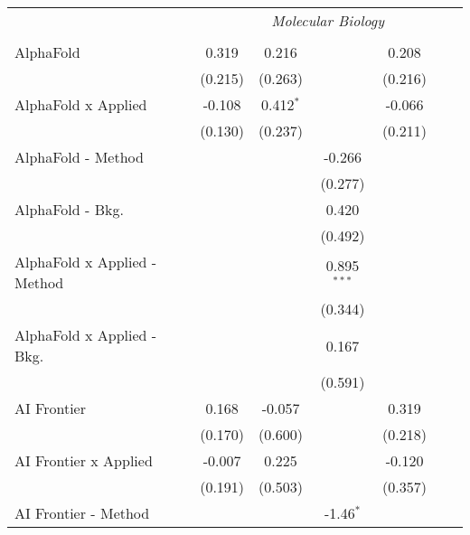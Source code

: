 \begin{tabular}{lcccccc}
 & \multicolumn{6}{c}{\textit{Molecular Biology}} \\ \\
   AlphaFold                      & 0.319    & 0.216         &               & 0.208   &        &   \\   
                                  & (0.215)  & (0.263)       &               & (0.216) &        &   \\   
   AlphaFold x Applied            & -0.108   & 0.412$^{*}$   &               & -0.066  &        &   \\   
                                  & (0.130)  & (0.237)       &               & (0.211) &        &   \\   
   AlphaFold - Method             &          &               & -0.266        &         &        &   \\   
                                  &          &               & (0.277)       &         &        &   \\   
   AlphaFold - Bkg.               &          &               & 0.420         &         &        &   \\   
                                  &          &               & (0.492)       &         &        &   \\   
   AlphaFold x Applied - Method   &          &               & 0.895$^{***}$ &         &        &   \\   
                                  &          &               & (0.344)       &         &        &   \\   
   AlphaFold x Applied - Bkg.     &          &               & 0.167         &         &        &   \\   
                                  &          &               & (0.591)       &         &        &   \\   
   AI Frontier                    & 0.168    & -0.057        &               & 0.319   &        &   \\   
                                  & (0.170)  & (0.600)       &               & (0.218) &        &   \\   
   AI Frontier x Applied          & -0.007   & 0.225         &               & -0.120  &        &   \\   
                                  & (0.191)  & (0.503)       &               & (0.357) &        &   \\   
   AI Frontier - Method           &          &               & -1.46$^{*}$   &         &        &   \\   

\end{tabular}
